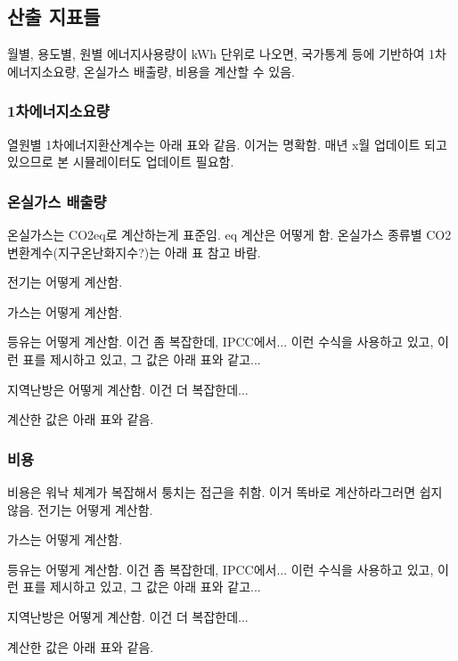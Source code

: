 \subsection{산출 지표들}
월별, 용도별, 원별 에너지사용량이 kWh 단위로 나오면, 국가통계 등에 기반하여 1차에너지소요량, 온실가스 배출량, 비용을 계산할 수 있음.

\subsubsection{1차에너지소요량}
열원별 1차에너지환산계수는 아래 표와 같음. 이거는 명확함. 매년 x월 업데이트 되고 있으므로 본 시뮬레이터도 업데이트 필요함.

\subsubsection{온실가스 배출량}
온실가스는 CO2eq로 계산하는게 표준임. eq 계산은 어떻게 함. 온실가스 종류별 CO2변환계수(지구온난화지수?)는 아래 표 참고 바람. \par
{}
전기는 어떻게 계산함. \par
가스는 어떻게 계산함. \par
등유는 어떻게 계산함. 이건 좀 복잡한데, IPCC에서... 이런 수식을 사용하고 있고, 이런 표를 제시하고 있고, 그 값은 아래 표와 같고... \par
지역난방은 어떻게 계산함. 이건 더 복잡한데...\par

계산한 값은 아래 표와 같음. 

\subsubsection{비용}
비용은 워낙 체계가 복잡해서 퉁치는 접근을 취함. 이거 똑바로 계산하라그러면 쉽지 않음.
전기는 어떻게 계산함. \par
가스는 어떻게 계산함. \par
등유는 어떻게 계산함. 이건 좀 복잡한데, IPCC에서... 이런 수식을 사용하고 있고, 이런 표를 제시하고 있고, 그 값은 아래 표와 같고... \par
지역난방은 어떻게 계산함. 이건 더 복잡한데...\par

계산한 값은 아래 표와 같음. 


